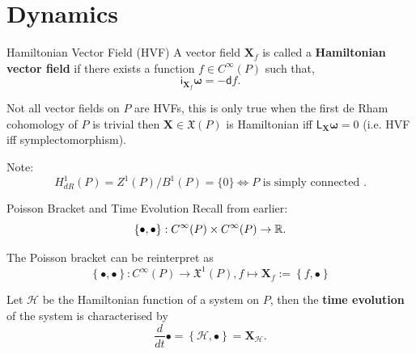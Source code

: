 \documentclass{beamer}
\begin{document}
\section{Dynamics}
\begin{frame}{}
  \begin{block}{Hamiltonian Vector Field (HVF)}
    A vector field \(\boldsymbol{X} _{f}\) is called a \textbf{Hamiltonian vector field} if there exists a function \(f \in C ^{\infty} (P)\) such that, 
    \begin{equation}
      \mathsf{i} _{\boldsymbol{X} _{f}} \boldsymbol{\omega}  = - \mathsf{d} f.
    \end{equation}

    Not all vector fields on \(P\) are HVFs, this is only true when the first de Rham cohomology of \(P\) is trivial then \(\boldsymbol{X} \in \mathfrak{X} (P)\) is Hamiltonian iff \(\mathsf{L}_ {\boldsymbol{X}} \boldsymbol{\omega} = 0\) (i.e. HVF iff symplectomorphism).

    Note:
    \begin{equation}
      H ^{1} _{dR} (P) = Z ^{1} (P) / B ^{1} (P) = \{0\} \iff P \text{ is simply connected }.
    \end{equation}
  \end{block}
\end{frame}

\begin{frame}{}
  \begin{block}{Poisson Bracket and Time Evolution}
    Recall from earlier:
    \begin{equation}
      \{\bullet, \bullet\}: C ^{\infty} (P) \times C ^{\infty} (P) \to \mathbb{R}.
    \end{equation}

    The Poisson bracket can be reinterpret as 
    \begin{equation}
      \left\{ \bullet, \bullet \right\}: C ^{\infty} (P) \to \mathfrak{X} ^{1} (P), f \mapsto \boldsymbol{X} _{f} := \left\{ f, \bullet \right\}
    \end{equation}

    Let \(\mathcal{H}\) be the Hamiltonian function of a system on \(P\), then the \textbf{time evolution} of the system is characterised by
    \begin{equation}
     \frac{d}{dt} \bullet = \left\{ \mathcal{H}, \bullet \right\} = \boldsymbol{X} _{\mathcal{H}}.
    \end{equation}
  \end{block}
\end{frame}
\end{document}
